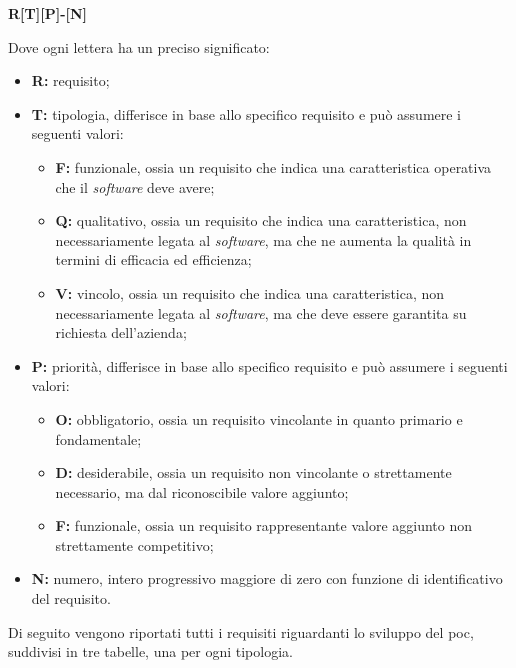 \begin{center}
	\textbf{R[T][P]-[N]}
\end{center}

Dove ogni lettera ha un preciso significato:

\begin{itemize}
	\item \textbf{R:} requisito;
	
	\item \textbf{T:} tipologia, differisce in base allo specifico requisito e può assumere i seguenti valori:
		\begin{itemize}
			\item \textbf{F:} funzionale, ossia un requisito che indica una caratteristica operativa che il \textit{software} deve avere;
			\item \textbf{Q:} qualitativo, ossia un requisito che indica una caratteristica, non necessariamente legata al \textit{software}, ma che ne aumenta la qualità in termini di efficacia ed efficienza;
			\item \textbf{V:} vincolo, ossia un requisito che indica una caratteristica, non necessariamente legata al \textit{software}, ma che deve essere garantita su richiesta dell'azienda;
		\end{itemize}
	
	\item \textbf{P:} priorità, differisce in base allo specifico requisito e può assumere i seguenti valori:
		\begin{itemize}
			\item \textbf{O:} obbligatorio, ossia un requisito vincolante in quanto primario e fondamentale;
			\item \textbf{D:} desiderabile, ossia un requisito non vincolante o strettamente necessario, ma dal riconoscibile valore aggiunto;
			\item \textbf{F:} funzionale, ossia un requisito rappresentante valore aggiunto non strettamente competitivo; 
		\end{itemize}
	
	\item \textbf{N:} numero, intero progressivo maggiore di zero con funzione di identificativo del requisito.
\end{itemize}

Di seguito vengono riportati tutti i requisiti riguardanti lo sviluppo del \gls{poc}, suddivisi in tre tabelle, una per ogni tipologia.

